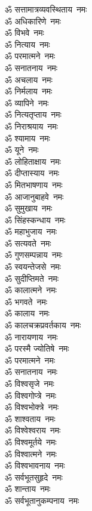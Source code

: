 \begin{multicols}{2}
\begin{flushleft}
ॐ सत्तामात्रव्यवस्थिताय~नमः\\
ॐ अधिकारिणे~नमः\\
ॐ विभवे~नमः\\
ॐ नित्याय~नमः\\
ॐ परमात्मने~नमः\\
ॐ सनातनाय~नमः\hfill{}\\
ॐ अचलाय~नमः\\
ॐ निर्मलाय~नमः\\
ॐ व्यापिने~नमः\\
ॐ नित्यतृप्ताय~नमः\\
ॐ निराश्रयाय~नमः\\
ॐ श्यामाय~नमः\\
ॐ यूने~नमः\\
ॐ लोहिताक्षाय~नमः\\
ॐ दीप्तास्याय~नमः\\
ॐ मितभाषणाय~नमः\hfill{}\\
ॐ आजानुबाहवे~नमः\\
ॐ सुमुखाय~नमः\\
ॐ सिंहस्कन्धाय~नमः\\
ॐ महाभुजाय~नमः\\
ॐ सत्यवते~नमः\\
ॐ गुणसम्पन्नाय~नमः\\
ॐ स्वयन्तेजसे~नमः\\
ॐ सुदीप्तिमते~नमः\\
ॐ कालात्मने~नमः\\
ॐ भगवते~नमः\hfill{}\\
ॐ कालाय~नमः\\
ॐ कालचक्रप्रवर्तकाय~नमः\\
ॐ नारायणाय~नमः\\
ॐ परस्मै ज्योतिषे~नमः\\
ॐ परमात्मने~नमः\\
ॐ सनातनाय~नमः\\
ॐ विश्वसृजे~नमः\\
ॐ विश्वगोप्त्रे~नमः\\
ॐ विश्वभोक्त्रे~नमः\\
ॐ शाश्वताय~नमः\hfill{}\\
ॐ विश्वेश्वराय~नमः\\
ॐ विश्वमूर्तये~नमः\\
ॐ विश्वात्मने~नमः\\
ॐ विश्वभावनाय~नमः\\
ॐ सर्वभूतसुहृदे~नमः\\
ॐ शान्ताय~नमः\\
ॐ सर्वभूतानुकम्पनाय~नमः\\

\end{flushleft}
\end{multicols}
